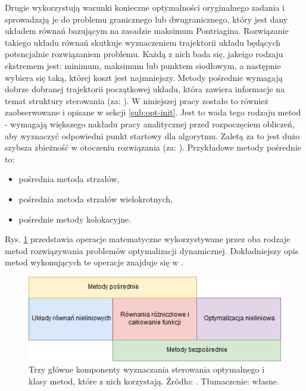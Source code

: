 Drugie wykorzystują warunki konieczne optymalności oryginalnego zadania i sprowadzają je do problemu granicznego lub dwugranicznego, który jest dany układem równań bazującym na zasadzie maksimum Pontriagina. Rozwiązanie takiego układu równań skutkuje wyznaczeniem trajektorii układu będących potencjalnie rozwiązaniem problemu. Każdą z nich bada się, jakeigo rodzaju ekstremem jest: minimum, maksimum lub punktem siodłowym, a następnie wybiera się taką, której koszt jest najmniejszy. Metody pośrednie wymagają dobrze dobranej trajektorii początkowej układu, która zawiera informacje na temat struktury sterowania (za: \cite{Korytowski2015}). W niniejszej pracy zostało to również zaobserwowane i opisane w sekcji \ref{sub:opt-init}. Jest to wada tego rodzaju metod - wymagają większego nakładu pracy analitycznej przed rozpoczęciem obliczeń, aby wyznaczyć odpowiedni punkt startowy dla algorytmu. Zaletą za to jest dużo szybsza zbieżność w otoczeniu rozwiązania (za: \cite{Korytowski2015}). Przykładowe metody pośrednie to:
\begin{itemize}
    \item pośrednia metoda strzałów,
    \item pośrednia metoda strzałów wielokrotnych,
    \item pośrednie metody kolokacyjne.
\end{itemize}

Rys. \ref{fig:num-methods} przedstawia operacje matematyczne wykorzystywane przez oba rodzaje metod rozwiązywania problemów optymalizacji dynamicznej. Dokładniejszy opis metod wykonujących te operacje znajduje się w \cite{Rao2010}.

\begin{figure}[htp]
    \centering
    \includegraphics[scale=0.8]{Grafika/num-methods}
    \caption{Trzy główne komponenty wyznaczania sterowania optymalnego i klasy metod, które z nich korzystają. Źródło: \cite{Rao2010}. Tłumaczenie: własne.}
    \label{fig:num-methods}
\end{figure}
